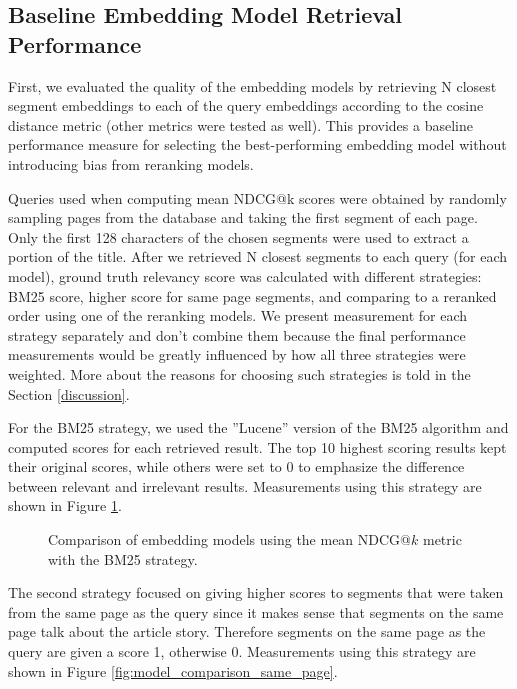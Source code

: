 \documentclass[conference]{IEEEtran}
\begin{document}
\subsection{Baseline Embedding Model Retrieval Performance}

First, we evaluated the quality of the embedding models by retrieving N closest segment embeddings to each of the query embeddings according to the cosine distance metric (other metrics were tested as well). This provides a baseline performance measure for selecting the best-performing embedding model without introducing bias from reranking models.

Queries used when computing mean NDCG@k scores were obtained by randomly sampling pages from the database and taking the first segment of each page. Only the first 128 characters of the chosen segments were used to extract a portion of the title. After we retrieved N closest segments to each query (for each model), ground truth relevancy score was calculated with different strategies: BM25 score, higher score for same page segments, and comparing to a reranked order using one of the reranking models. We present measurement for each strategy separately and don't combine them because the final performance measurements would be greatly influenced by how all three strategies were weighted. More about the reasons for choosing such strategies is told in the Section \ref{discussion}.

For the BM25 strategy, we used the ''Lucene'' version of the BM25 algorithm and computed scores for each retrieved result. The top 10 highest scoring results kept their original scores, while others were set to 0 to emphasize the difference between relevant and irrelevant results. Measurements using this strategy are shown in Figure \ref{fig:model_comparison_bm25}.

\begin{figure}
    \centering
    
    \caption{Comparison of embedding models using the mean NDCG@\(k\) metric with the BM25 strategy.}
    \label{fig:model_comparison_bm25}
\end{figure}

The second strategy focused on giving higher scores to segments that were taken from the same page as the query since it makes sense that segments on the same page talk about the article story. Therefore segments on the same page as the query are given a score 1, otherwise 0. Measurements using this strategy are shown in Figure \ref{fig:model_comparison_same_page}.
\end{document}
